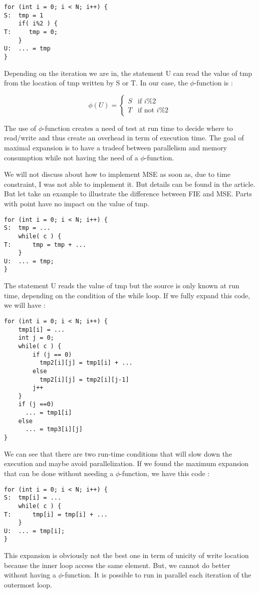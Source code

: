 \begin{lstlisting}[frame=single]
for (int i = 0; i < N; i++) {
S:  tmp = 1
    if( i%2 ) {
T:     tmp = 0;
    }
U:  ... = tmp
}
\end{lstlisting}

Depending on the iteration we are in, the statement U can read the value of tmp from the location of tmp written by S or T. In our case, the $\phi$-function is :

\[ \phi(U) = \begin{cases} 
      S & \text{if $i\%2$} \\
      T & \text{if not $i\%2$}
   \end{cases}
\]

The use of $\phi$-function creates a need of test at run time to decide where to read/write and thus create an overhead in term of execution time. The goal of maximal expansion is to have a tradeof between parallelism and memory consumption while not having the need of a $\phi$-function. 

We will not discuss about how to implement \ac{MSE} as soon as, due to time constraint, I was not able to implement it. But details can be found in the article\cite{MSE}. But let take an example to illustrate the difference between \ac{FIE} and \ac{MSE}. Parts with point have no impact on the value of tmp.

\begin{lstlisting}[frame=single]
for (int i = 0; i < N; i++) {
S:  tmp = ...
    while( c ) {
T:      tmp = tmp + ...
    }
U:  ... = tmp;
}
\end{lstlisting}

The statement U reads the value of tmp but the source is only known at run time, depending on the condition of the while loop. If we fully expand this code, we will have :

\begin{lstlisting}[frame=single]
for (int i = 0; i < N; i++) {
    tmp1[i] = ...
    int j = 0;
    while( c ) {
        if (j == 0)
          tmp2[i][j] = tmp1[i] + ...
        else
          tmp2[i][j] = tmp2[i][j-1]
        j++
    }
    if (j ==0)
      ... = tmp1[i]
    else
      ... = tmp3[i][j]
}
\end{lstlisting}
We can see that there are two run-time conditions that will slow down the execution and maybe avoid parallelization. If we found the maximum expansion that can be done without needing a $\phi$-function, we have this code :

\begin{lstlisting}[frame=single]
for (int i = 0; i < N; i++) {
S:  tmp[i] = ...
    while( c ) {
T:      tmp[i] = tmp[i] + ...
    }
U:  ... = tmp[i];
}
\end{lstlisting}
This expansion is obviously not the best one in term of unicity of write location because the inner loop access the same element. But, we cannot do better without having a $\phi$-function. It is  possible to run in parallel each iteration of the outermost loop.